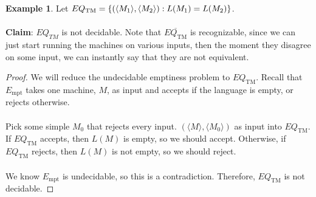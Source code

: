 \documentclass[]{article}
\DeclarePairedDelimiter{\set}{\lbrace}{\rbrace}
\theoremstyle{definition}
\newtheorem{ex}{Example}[section]
\begin{document}
      \begin{ex}
        Let $EQ_\text{TM} = \set{(\langle M_1 \rangle, \langle M_2 \rangle) : L(M_1) = L(M_2)}$.
        \\ \\
        \textbf{Claim}: $EQ_{TM}$ is not decidable. Note that $\overline{EQ_\text{TM}}$ is recognizable, since we can just start running the machines on various inputs, then the moment they disagree on some input, we can instantly say that they are not equivalent.

        \begin{proof}
          We will reduce the undecidable emptiness problem to $EQ_\text{TM}$. Recall that $E_\text{mpt}$ takes one machine, $M$, as input and accepts if the language is empty, or rejects otherwise.
          \\ \\
          Pick some simple $M_0$ that rejects every input. $(\langle M \rangle, \langle M_0 \rangle)$ as input into $EQ_\text{TM}$. If $EQ_\text{TM}$ accepts, then $L(M)$ is empty, so we should accept. Otherwise, if $EQ_\text{TM}$ rejects, then $L(M)$ is not empty, so we should reject.
          \\ \\
          We know $E_\text{mpt}$ is undecidable, so this is a contradiction. Therefore, $EQ_\text{TM}$ is not decidable.
        \end{proof}
      \end{ex}
\end{document}
